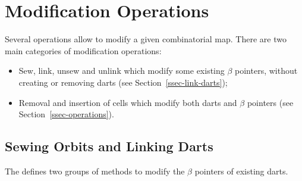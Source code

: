 \section{Modification Operations}

Several operations allow to modify a given combinatorial map.
There are two main categories of modification operations:
\begin{itemize}
\item Sew, link, unsew and unlink which modify some existing $\beta$
  pointers, without creating or removing darts (see
  Section~\ref{ssec-link-darts});
\item Removal and insertion of cells which modify both darts and
  $\beta$ pointers (see Section~\ref{ssec-operations}).
\end{itemize}
%

\subsection{Sewing Orbits and Linking Darts \label{ssec-link-darts}}

The  defines two groups of methods to modify the
$\beta$ pointers of existing darts.

